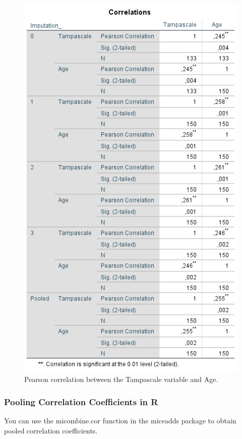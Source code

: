 \documentclass[]{book}
\theoremstyle{definition}
\theoremstyle{definition}
\theoremstyle{definition}
\theoremstyle{remark}
\begin{document}
\begin{figure}

{\centering \includegraphics[width=0.9\linewidth]{images/table5.4} 

}

\caption{Pearson correlation between the Tampascale variable and Age.}\label{fig:tab5-4}
\end{figure}

\subsubsection{Pooling Correlation Coefficients in
R}\label{pooling-correlation-coefficients-in-r}

You can use the micombine.cor function in the miceadds package to obtain
pooled correlation coefficients.
\end{document}
